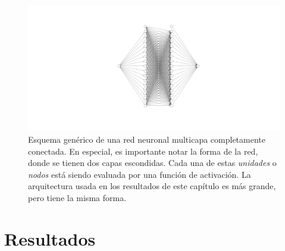 \begin{figure}
    \includegraphics[width=\textwidth]{figuras/capitulo-3/neural-network.pdf}
    \vspace{-1.5cm}
    \caption{Esquema genérico de una red neuronal multicapa completamente conectada. En especial, es importante notar la forma de la red, donde se tienen dos capas escondidas. Cada una de estas \emph{unidades} o \emph{nodos} está siendo evaluada por una función de activación. La arquitectura usada en los resultados de este capítulo es más grande, pero tiene la misma forma.}
    \label{fig:nn-esquema}
\end{figure}

\section{Resultados}

